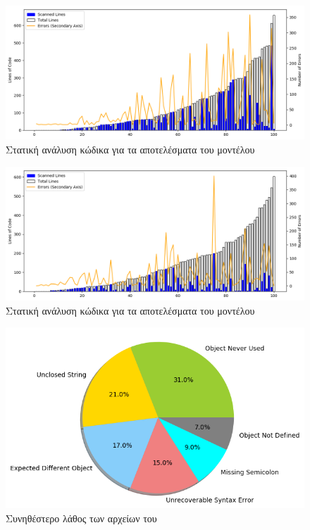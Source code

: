 

\begin{figure}[!htb]
	\caption{Στατική ανάλυση κώδικα για τα αποτελέσματα του  μοντέλου}
	\label{static-github-char}
	\includegraphics[width=\textwidth, keepaspectratio]{images/jshint-githubChar.png}
\end{figure}

\begin{figure}[!htb]
	\caption{Στατική ανάλυση κώδικα για τα αποτελέσματα του  μοντέλου}
	\label{static-github-labeled}
	\includegraphics[width=\textwidth, keepaspectratio]{images/jshint-githubLabeled.png}
\end{figure}

\begin{figure}[!htb]
	\caption{Συνηθέστερο λάθος των αρχείων του }
	\label{MCE1-githubchar}
	\includegraphics[width=\textwidth, keepaspectratio]{images/MCE-githubchar.png}
\end{figure}

